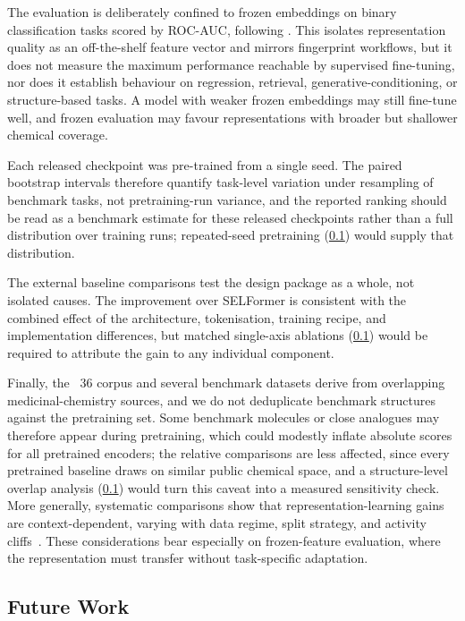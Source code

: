 \documentclass[11pt,a4paper]{article}
\begin{document}
The evaluation is deliberately confined to frozen embeddings on binary
classification tasks scored by ROC-AUC, following
\citet{praskiBenchmarkingPretrainedMolecular2025}. This isolates representation
quality as an off-the-shelf feature vector and mirrors fingerprint workflows,
but it does not measure the maximum performance reachable by supervised
fine-tuning, nor does it establish behaviour on regression, retrieval,
generative-conditioning, or structure-based tasks. A model with weaker frozen
embeddings may still fine-tune well, and frozen evaluation may favour
representations with broader but shallower chemical coverage.

Each released checkpoint was pre-trained from a single seed. The paired
bootstrap intervals therefore quantify task-level variation under resampling of
benchmark tasks, not pretraining-run variance, and the reported ranking should
be read as a benchmark estimate for these released checkpoints rather than a
full distribution over training runs; repeated-seed pretraining
(\cref{sec:future-work}) would supply that distribution.

The external baseline comparisons test the \model{} design package as a whole,
not isolated causes. The improvement over SELFormer is consistent with the
combined effect of the \modernbert{} architecture, \ape{} tokenisation,
training recipe, and implementation differences, but matched single-axis
ablations (\cref{sec:future-work}) would be required to attribute the gain to
any individual component.

Finally, the \chembl{}~36 corpus and several benchmark datasets derive from
overlapping medicinal-chemistry sources, and we do not deduplicate benchmark
structures against the pretraining set. Some benchmark molecules or close
analogues may therefore appear during pretraining, which could modestly inflate
absolute scores for all pretrained encoders; the relative comparisons are less
affected, since every pretrained baseline draws on similar public chemical
space, and a structure-level overlap analysis (\cref{sec:future-work}) would
turn this caveat into a measured sensitivity check. More generally, systematic
comparisons show that representation-learning gains are context-dependent,
varying with data regime, split strategy, and activity
cliffs~\citep{yangAnalyzingLearnedMolecular2019,dengSystematicStudyKey2023}.
These considerations bear especially on frozen-feature evaluation, where the
representation must transfer without task-specific adaptation.

\subsection{Future Work}
\label{sec:future-work}
\end{document}

